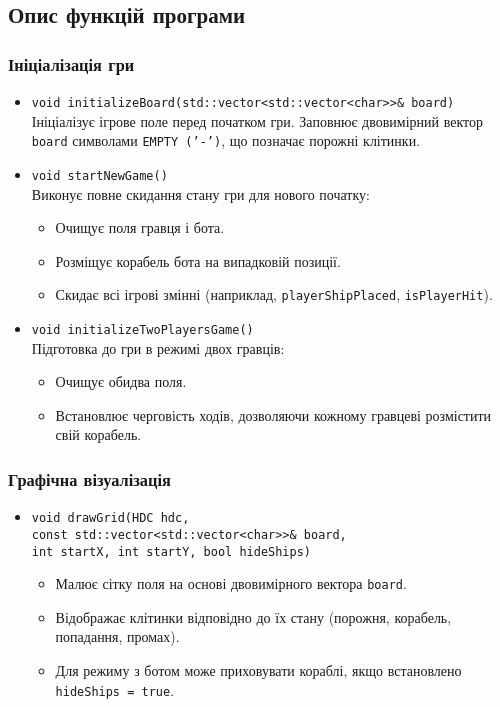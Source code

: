 \documentclass[12pt]{article}
\begin{document}
\subsection{Опис функцій програми}
\subsubsection{Ініціалізація гри}
\begin{itemize}
    \item \texttt{void initializeBoard(std::vector<std::vector<char>>\& board)}\\
    Ініціалізує ігрове поле перед початком гри. Заповнює двовимірний вектор \texttt{board} символами \texttt{EMPTY ('-')}, що позначає порожні клітинки.
    \item \texttt{void startNewGame()}\\
    Виконує повне скидання стану гри для нового початку:
    \begin{itemize}
        \item Очищує поля гравця і бота.
        \item Розміщує корабель бота на випадковій позиції.
        \item Скидає всі ігрові змінні (наприклад, \texttt{playerShipPlaced}, \texttt{isPlayerHit}).
    \end{itemize}
    \item \texttt{void initializeTwoPlayersGame()}\\
    Підготовка до гри в режимі двох гравців:
    \begin{itemize}
        \item Очищує обидва поля.
        \item Встановлює черговість ходів, дозволяючи кожному гравцеві розмістити свій корабель.
    \end{itemize}
\end{itemize}

\subsubsection{Графічна візуалізація}
\begin{itemize}
    \item \texttt{void drawGrid(HDC hdc,} \\
    \texttt{const std::vector<std::vector<char>>\& board,} \\
    \texttt{int startX, int startY, bool hideShips)}
    \begin{itemize}
        \item Малює сітку поля на основі двовимірного вектора \texttt{board}.
        \item Відображає клітинки відповідно до їх стану (порожня, корабель, попадання, промах).
        \item Для режиму з ботом може приховувати кораблі, якщо встановлено \texttt{hideShips = true}.
    \end{itemize}
\end{itemize}
\end{document}
